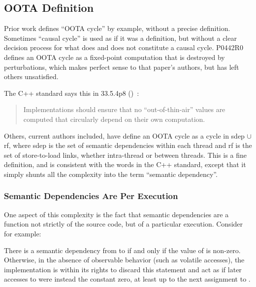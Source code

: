 \documentclass[10]{article}
\begin{document}
\subsection{OOTA Definition}
\label{sec:OOTA Definition}

Prior work defines ``OOTA cycle'' by example, without a precise
definition.
Sometimes ``causal cycle'' is used as if it was a definition, but
without a clear decision process for what does and does not
constitute a causal cycle.
P0442R0 defines an OOTA cycle as a fixed-point computation that is
destroyed by perturbations, which makes perfect sense to that paper's
authors, but has left others unsatisfied.

The C++ standard says this in 33.5.4p8
()~\cite{ThomasKoeppe2023N4950}:

\begin{quote}
	Implementations should ensure that no “out-of-thin-air” values
	are computed that circularly depend on their own computation.
\end{quote}

Others, current authors included, have define an OOTA cycle as a
cycle in sdep $\cup$ rf, where sdep is the set of semantic
dependencies within each thread and rf is the set of store-to-load
links, whether intra-thread or between threads.
This is a fine definition, and is consistent with the words in the C++
standard, except that it simply shunts all the complexity into the
term ``semantic dependency''.

\subsubsection{Semantic Dependencies Are Per Execution}
\label{sec:Semantic Dependencies Are Per Execution}

One aspect of this complexity is the fact that semantic dependencies
are a function not strictly of the source code, but of a particular
execution.
Consider for example:

\begin{quote}
\end{quote}

There is a semantic dependency from  to  if and only if the
value of  is non-zero.
Otherwise, in the absence of observable behavior (such as volatile
accesses), the implementation is within its rights to discard this
statement and act as if later accesses to  were instead the
constant zero, at least up to the next assignment to .
\end{document}
